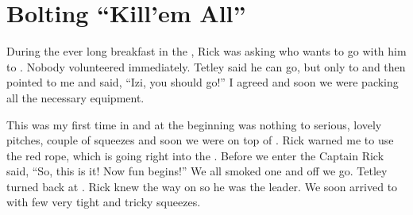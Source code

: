 \section{Bolting ``Kill'em All''}


During the ever long breakfast in the , Rick was asking who wants to
go with him to . Nobody volunteered immediately. Tetley
said he can go, but only to  and then pointed to me and
said, ``Izi, you should go!'' I agreed and soon we were packing all the
necessary equipment.

This was my first time in  and at the beginning was nothing to
serious, lovely pitches, couple of squeezes and soon we were on top of
. Rick warned me to use the red rope, which is going right into the
. Before we enter the Captain Rick said, ``So, this is
it! Now fun begins!'' We all smoked one and off we go. Tetley turned
back at . Rick knew the way on so he was the leader. We
soon arrived to  with few very tight and tricky squeezes.

